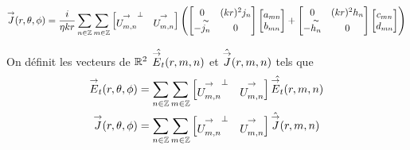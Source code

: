         \begin{equation}
            {\overset{\rightarrow}{J}}(r,\theta,\phi) = \dfrac{i}{\eta kr}\sum_{n\in\mathbb Z}\sum_{m\in\mathbb Z}
            \begin{bmatrix}
                {\overset{\rightarrow}{U_{m,n}^{{}}}}^\perp & {\overset{\rightarrow}{U_{m,n}^{{}}}}
            \end{bmatrix}
            \left( 
                \begin{bmatrix}
                    0 & (kr)^2 j_n
                    \\
                    -\overset{\thicksim}{j_n} & 0
                \end{bmatrix}
                \begin{bmatrix}
                    a_{mn}
                    \\
                    b_{mn}
                \end{bmatrix}
                + 
                \begin{bmatrix}
                    0 & (kr)^2 h_n
                    \\
                    -\overset{\thicksim}{h_n} & 0
                \end{bmatrix}
                \begin{bmatrix}
                    c_{mn}
                    \\
                    d_{mn}
                \end{bmatrix}
            \right)
        \end{equation}

        \begin{defn}
            On définit les vecteurs de \(\mathbb R^2\) \(\hat{{\overset{\rightarrow}{E}}_t}(r,m,n)\) et \(\hat{{\overset{\rightarrow}{J}}}(r,m,n)\) tels que
            \begin{align}
                {\overset{\rightarrow}{E}}_t(r,\theta,\phi) &= \sum_{n\in\mathbb Z}\sum_{m\in\mathbb Z}
                \begin{bmatrix}
                  {\overset{\rightarrow}{U_{m,n}^{{}}}}^\perp & {\overset{\rightarrow}{U_{m,n}^{{}}}}
                \end{bmatrix}\hat{{\overset{\rightarrow}{E}}_t}(r,m,n)
                \\
                {\overset{\rightarrow}{J}}(r,\theta,\phi) &= \sum_{n\in\mathbb Z}\sum_{m\in\mathbb Z}
                \begin{bmatrix}
                  {\overset{\rightarrow}{U_{m,n}^{{}}}}^\perp & {\overset{\rightarrow}{U_{m,n}^{{}}}}
                \end{bmatrix}\hat{{\overset{\rightarrow}{J}}}(r,m,n)
            \end{align}
        \end{defn}

